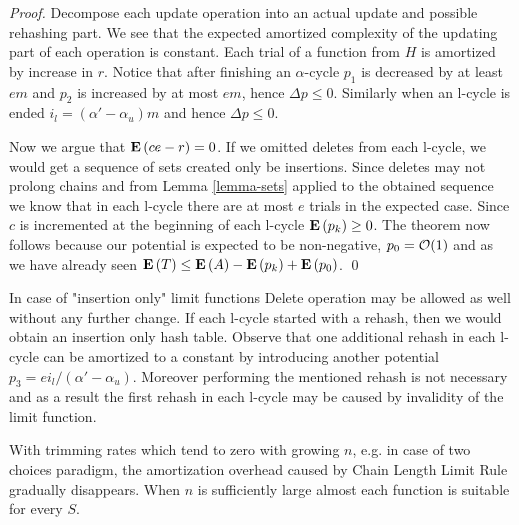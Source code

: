 \begin{proof}
Decompose each update operation into an actual update and possible rehashing part. We see that the expected amortized complexity of the updating part of each operation is constant. Each trial of a function from $H$ is amortized by increase in $r$. Notice that after finishing an $\alpha$-cycle $p_1$ is decreased by at least $em$ and $p_2$ is increased by at most $em$, hence $\Delta p \leq 0$. Similarly when an l-cycle is ended $i_l = (\alpha' - \alpha_u)m$ and hence $\Delta p \leq 0$. 

Now we argue that $\mathbf{E}\left(ce - r\right) = 0$. If we omitted deletes from each l-cycle, we would get a sequence of sets created only be insertions. Since deletes may not prolong chains and from Lemma \ref{lemma-sets} applied to the obtained sequence we know that in each l-cycle there are at most $e$ trials in the expected case. Since $c$ is incremented at the beginning of each l-cycle $\mathbf{E}\left(p_k\right) \geq 0$. The theorem now follows because our potential is expected to be non-negative, $p_0 = \mathcal{O}(1)$ and as we have already seen $\mathbf{E}\left(T\right) \leq \mathbf{E}\left(A\right) - \mathbf{E}\left(p_k\right) + \mathbf{E}\left(p_0\right)$.
\qed
\end{proof}

In case of "insertion only" limit functions Delete operation may be allowed as well without any further change. If each l-cycle started with a rehash, then we would obtain an insertion only hash table. Observe that one additional rehash in each l-cycle can be amortized to a constant by introducing another potential $p_3 = {ei_{l}}/{(\alpha' - \alpha_u)}$. Moreover performing the mentioned rehash is not necessary and as a result the first rehash in each l-cycle may be caused by invalidity of the limit function.

With trimming rates which tend to zero with growing $n$, e.g. in case of two choices paradigm, the amortization overhead caused by Chain Length Limit Rule gradually disappears. When $n$ is sufficiently large almost each function is suitable for every $S$.
